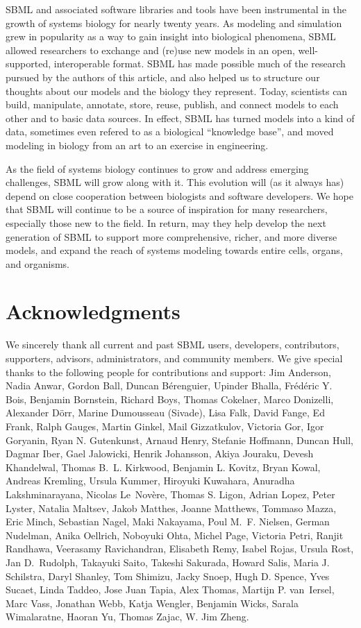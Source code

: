 \documentclass{sbml-paper}
\begin{document}
SBML and associated software libraries and tools have been instrumental in the growth of systems biology for nearly twenty years.  As modeling and simulation grew in popularity as a way to gain insight into biological phenomena, SBML allowed researchers to exchange and (re)use new models in an open, well-supported, interoperable format. SBML has made possible much of the research pursued by the authors of this article, and also helped us to structure our thoughts about our models and the biology they represent.  Today, scientists can build, manipulate, annotate, store, reuse, publish, and connect models to each other and to basic data sources.  In effect, SBML has turned models into a kind of data, sometimes even refered to as a biological ``knowledge base'', and moved modeling in biology from an art to an exercise in engineering.

As the field of systems biology continues to grow and address emerging challenges, SBML will grow along with it.  This evolution will (as it always has) depend on close cooperation between biologists and software developers.  We hope that SBML will continue to be a source of inspiration for many researchers, especially those new to the field.  In return, may they help develop the next generation of SBML to support more comprehensive, richer, and more diverse models, and expand the reach of systems modeling towards entire cells, organs, and organisms.


\section{Acknowledgments}

We sincerely thank all current and past SBML users, developers, contributors, supporters, advisors, administrators, and community members.  We give special thanks to the following people for contributions and support:
Jim Anderson,
Nadia Anwar,
Gordon Ball,
Duncan B\'{e}renguier,
Upinder Bhalla,
Fr\'{e}d\'{e}ric Y. Bois,
Benjamin Bornstein,
Richard Boys,
Thomas Cokelaer,
Marco Donizelli,
Alexander D\"{o}rr,
Marine Dumousseau (Sivade),
Lisa Falk,
David Fange,
Ed Frank,
Ralph Gauges,
Martin Ginkel,
Mail Gizzatkulov,
Victoria Gor,
Igor Goryanin,
Ryan N. Gutenkunst,
Arnaud Henry,
Stefanie Hoffmann,
Duncan Hull,
Dagmar Iber,
Gael Jalowicki,
Henrik Johansson,
Akiya Jouraku,
Devesh Khandelwal,
Thomas B.~L. Kirkwood,
Benjamin L. Kovitz,
Bryan Kowal,
Andreas Kremling,
Ursula Kummer,
Hiroyuki Kuwahara,
Anuradha Lakshminarayana,
Nicolas Le~Nov\`{e}re,
Thomas S. Ligon,
Adrian Lopez,
Peter Lyster,
Natalia Maltsev,
Jakob Matthes,
Joanne Matthews,
Tommaso Mazza,
Eric Minch,
Sebastian Nagel,
Maki Nakayama,
Poul M.~F. Nielsen,
German Nudelman,
Anika Oellrich,
Noboyuki Ohta,
Michel Page,
Victoria Petri,
Ranjit Randhawa,
Veerasamy Ravichandran,
Elisabeth Remy,
Isabel Rojas,
Ursula Rost,
Jan D.~Rudolph,
Takayuki Saito,
Takeshi Sakurada,
Howard Salis,
Maria J. Schilstra,
Daryl Shanley,
Tom Shimizu,
Jacky Snoep,
Hugh D. Spence,
Yves Sucaet,
Linda Taddeo,
Jose Juan Tapia,
Alex Thomas,
Martijn P. van~Iersel,
Marc Vass,
Jonathan Webb,
Katja Wengler,
Benjamin Wicks,
Sarala Wimalaratne,
Haoran Yu,
Thomas Zajac,
W. Jim Zheng.
\end{document}
